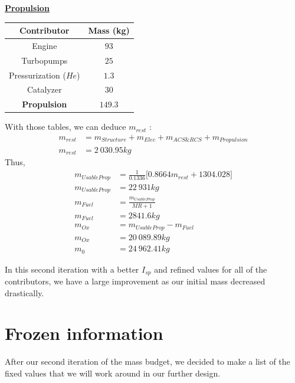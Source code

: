 \textbf{\underline{Propulsion}}
\begin{center}
	\begin{tabular}[H]{|c|c|}
		\hline
		\cellcolor{gray!50}Contributor & \cellcolor{gray!50}Mass (kg)\\
		\hline
		Engine & $93$\\
		\hline
		Turbopumps & $25$\\
		\hline
		Pressurization ($He$) & $1.3$\\
		\hline
		Catalyzer & $30$\\
		\hline
		\cellcolor{green!30}\textbf{Propulsion} & \textbf{$149.3$}\\
		\hline
	\end{tabular}
\end{center}

With those tables, we can deduce $m_{rest}$ :
\begin{align}
	m_{rest} &= m_{Structure} + m_{Elec} + m_{ACS\&RCS} + m_{Propulsion}\\
	m_{rest} &= 2\ 030.95kg
\end{align}
Thus,
\begin{align}
	m_{UsableProp} &= \frac 1{0.1336}\bigg[0.8664 m_{rest} + 1304.028\bigg]\\
	m_{UsableProp} &= 22\ 931kg\\
	m_{Fuel} &= \frac{m_{UsableProp}}{MR+1}\\
	m_{Fuel} &= 2841.6kg\\
	m_{Ox} &= m_{UsableProp} - m_{Fuel}\\
	m_{Ox} &= 20\ 089.89kg\\
	m_0 &= 24\ 962.41kg
\end{align}



In this second iteration with a better \(I_{sp}\) and refined values for all of the contributors, we have a large improvement as our initial mass decreased drastically.
\newpage
\section{Frozen information}
After our second iteration of the mass budget, we decided to make a list of the fixed values that we will work around in our further design.
